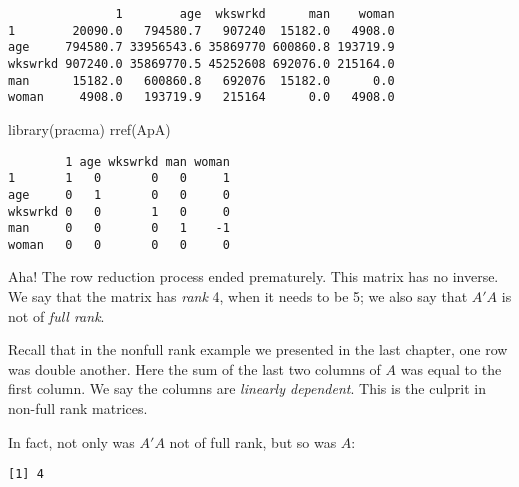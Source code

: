 \documentclass[
  letterpaper,
  DIV=11,
  numbers=noendperiod,
  oneside]{scrreprt}
\newenvironment{Shaded}{\begin{snugshade}}{\end{snugshade}}
\newcommand{\FunctionTok}[1]{\textcolor[rgb]{0.28,0.35,0.67}{#1}}
\newcommand{\NormalTok}[1]{\textcolor[rgb]{0.00,0.23,0.31}{#1}}
\newcommand{\SpecialCharTok}[1]{\textcolor[rgb]{0.37,0.37,0.37}{#1}}
\begin{document}
\begin{verbatim}
               1        age  wkswrkd      man    woman
1        20090.0   794580.7   907240  15182.0   4908.0
age     794580.7 33956543.6 35869770 600860.8 193719.9
wkswrkd 907240.0 35869770.5 45252608 692076.0 215164.0
man      15182.0   600860.8   692076  15182.0      0.0
woman     4908.0   193719.9   215164      0.0   4908.0
\end{verbatim}

\begin{Shaded}
\begin{Highlighting}[]
\FunctionTok{library}\NormalTok{(pracma)}
\FunctionTok{rref}\NormalTok{(ApA) }
\end{Highlighting}
\end{Shaded}

\begin{verbatim}
        1 age wkswrkd man woman
1       1   0       0   0     1
age     0   1       0   0     0
wkswrkd 0   0       1   0     0
man     0   0       0   1    -1
woman   0   0       0   0     0
\end{verbatim}

Aha! The row reduction process ended prematurely. This matrix has no
inverse. We say that the matrix has \emph{rank} 4, when it needs to be
5; we also say that \(A'A\) is not of \emph{full rank}.

Recall that in the nonfull rank example we presented in the last
chapter, one row was double another. Here the sum of the last two
columns of \(A\) was equal to the first column. We say the columns are
\emph{linearly dependent}. This is the culprit in non-full rank
matrices.

In fact, not only was \(A'A\) not of full rank, but so was \(A\):

\begin{Shaded}
\end{Shaded}

\begin{verbatim}
[1] 4
\end{verbatim}

\begin{Shaded}
\end{Shaded}
\end{document}
